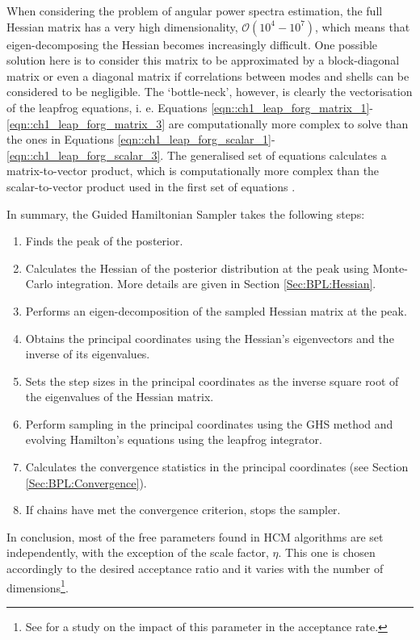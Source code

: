 \qquad When considering the problem of angular power spectra estimation, the full Hessian matrix has a very high dimensionality, $\mathcal{O}(10^{4}-10^{7})$, which means that eigen-decomposing the Hessian becomes increasingly difficult. One possible solution here is to consider this matrix to be approximated by a block-diagonal matrix or even a diagonal matrix if correlations between modes and shells can be considered to be negligible. The `bottle-neck', however, is clearly the vectorisation of the leapfrog equations, i. e. Equations \eqref{eqn::ch1_leap_forg_matrix_1}-\eqref{eqn::ch1_leap_forg_matrix_3} are computationally more complex to solve than the ones in Equations \eqref{eqn::ch1_leap_forg_scalar_1}-\eqref{eqn::ch1_leap_forg_scalar_3}. The generalised set of equations calculates a matrix-to-vector product, which is computationally more complex than the scalar-to-vector product used in the first set of equations \citep{SreeThesis}.

\qquad In summary, the Guided Hamiltonian Sampler takes the following steps:
\begin{enumerate}
\item Finds the peak of the posterior.
\item Calculates the Hessian of the posterior distribution at the peak using Monte-Carlo integration. More details are given in Section \ref{Sec:BPL:Hessian}.
\item Performs an eigen-decomposition of the sampled Hessian matrix at the peak.
\item Obtains the principal coordinates using the Hessian's eigenvectors and the inverse of its eigenvalues.
\item Sets the step sizes in the principal coordinates as the inverse square root of the eigenvalues of the Hessian matrix.
\item Perform sampling in the principal coordinates using the GHS method and evolving Hamilton's equations using the leapfrog integrator.
\item Calculates the convergence statistics in the principal coordinates (see Section \ref{Sec:BPL:Convergence}).
\item If chains have met the convergence criterion, stops the sampler.
\end{enumerate}

In conclusion, most of the free parameters found in HCM algorithms are set independently, with the exception of the scale factor, $\eta$. This one is chosen accordingly to the desired acceptance ratio and it varies with the number of dimensions\footnote{See \citealt{SreeThesis} for a study on the impact of this parameter in the acceptance rate.}.

